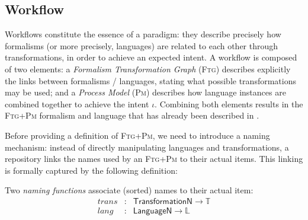 \begin{Example}
   
\end{Example}


\subsection{Workflow}
\label{sec:Workflow}

Workflows constitute the essence of a paradigm: they describe precisely how 
formalisms (or more precisely, languages) are related to each other through 
transformations, in order to achieve an expected intent. 
A workflow is composed of two elements: a \emph{Formalism Transformation Graph} 
(\textsc{Ftg}) describes explicitly the links between formalisms / languages, 
stating what possible transformations may be used; and a \emph{Process Model} 
(\textsc{Pm}) describes how language instances are 
combined together to achieve the intent $\iota$. Combining both elements 
results in the \textsc{Ftg+Pm} formalism and language that has already been 
described in \cite{}.

Before providing a definition of \textsc{Ftg+Pm}, we need to introduce a naming 
mechanism: instead of directly manipulating languages and transformations, a 
repository links the names used by an \textsc{Ftg+Pm} to their actual items. 
This linking is formally captured by the following definition:



\begin{Definition}[Naming]
   Two \emph{naming functions} associate (sorted) names to their actual item:
   \begin{displaymath}
      \begin{array}{rcl}
         trans &\colon& \mathsf{TransformationN} \to \mathbb{T}\\
         lang  &\colon& \mathsf{LanguageN} \to \mathbb{L}
      \end{array}
   \end{displaymath}
\end{Definition}

